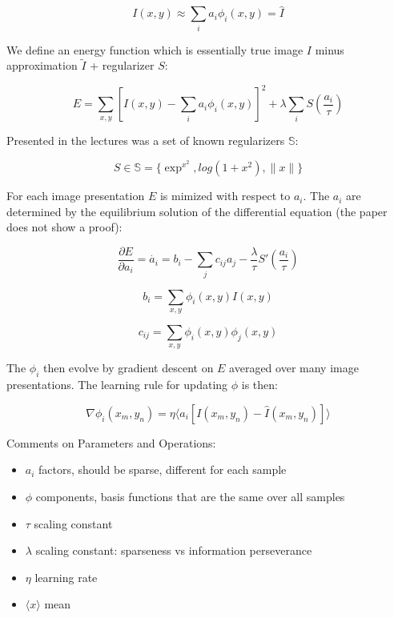 \documentclass[main]{subfiles}
\begin{document}
\begin{equation}
    I(x,y) \approx \sum_i a_i \phi_i(x,y) = \hat{I}
\end{equation}

We define an energy function which is essentially true image $I$ minus approximation $\tilde{I}$ + regularizer $S$:

\begin{equation}
    E = \sum_{x,y}[I(x,y)-\sum_i a_i  \phi_i(x,y)]^2 + \lambda \sum_i S(\frac{a_i}{\tau})
\end{equation}

Presented in the lectures was a set of known regularizers $\mathbb{S}$:

\begin{equation}
    S \in \mathbb{S} = \{ \exp^{x^2}, log(1+x^2), \|x\| \}
\end{equation}

For each image presentation $E$ is mimized with respect to $a_i$.
The $a_i$ are determined by the equilibrium solution of the differential equation (the paper does not show a proof):

\begin{equation}
    \frac{\partial E}{\partial a_i} = \Dot{a_i} = b_i - \sum_j c_{ij}a_j - \frac{\lambda} {\tau} S'(\frac{a_i}{\tau})
\end{equation}

\begin{equation}
    b_i = \sum_{x,y} \phi_i(x,y)I(x,y)
\end{equation}
    
\begin{equation}
    c_{ij} = \sum_{x,y} \phi_i(x,y)\phi_j(x,y)
\end{equation}

The $\phi_i$ then evolve by gradient descent on $E$ averaged over many image presentations. The learning rule for updating $\phi$ is then:

\begin{equation}
    \nabla \phi_i(x_m, y_n) = \eta \langle a_i [I(x_m, y_n) - \hat{I}(x_m, y_n)] \rangle
\end{equation}

Comments on Parameters and Operations:
\begin{itemize}
    \item $a_i$ factors, should be sparse, different for each sample
    \item $\phi$ components, basis functions that are the same over all samples
    \item $\tau$ scaling constant
    \item $\lambda$ scaling constant: sparseness vs information perseverance
    \item $\eta$ learning rate
    \item $\langle x \rangle$ mean
\end{itemize}
\end{document}
